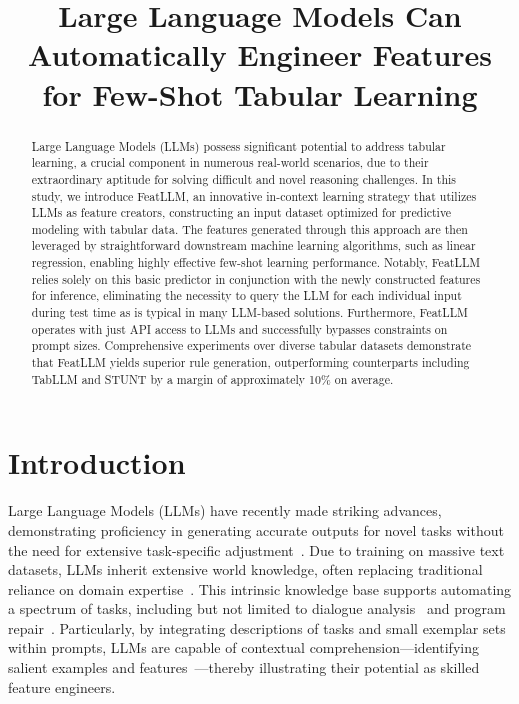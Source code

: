 \title{Large Language Models Can Automatically Engineer Features for Few-Shot Tabular Learning}

\begin{abstract}
Large Language Models (LLMs) possess significant potential to address tabular learning, a crucial component in numerous real-world scenarios, due to their extraordinary aptitude for solving difficult and novel reasoning challenges. In this study, we introduce \textsf{FeatLLM}, an innovative in-context learning strategy that utilizes LLMs as feature creators, constructing an input dataset optimized for predictive modeling with tabular data. The features generated through this approach are then leveraged by straightforward downstream machine learning algorithms, such as linear regression, enabling highly effective few-shot learning performance. Notably, \textsf{FeatLLM} relies solely on this basic predictor in conjunction with the newly constructed features for inference, eliminating the necessity to query the LLM for each individual input during test time as is typical in many LLM-based solutions. Furthermore, \textsf{FeatLLM} operates with just API access to LLMs and successfully bypasses constraints on prompt sizes. Comprehensive experiments over diverse tabular datasets demonstrate that \textsf{FeatLLM} yields superior rule generation, outperforming counterparts including TabLLM and STUNT by a margin of approximately 10\% on average.
\end{abstract}

\section{Introduction}
Large Language Models (LLMs) have recently made striking advances, demonstrating proficiency in generating accurate outputs for novel tasks without the need for extensive task-specific adjustment~\cite{creswell2022selection,imani2023mathprompter,taylor2022galactica}. Due to training on massive text datasets, LLMs inherit extensive world knowledge, often replacing traditional reliance on domain expertise~\cite{Genomes2021,singhal2023large,wilcox2003role}. This intrinsic knowledge base supports automating a spectrum of tasks, including but not limited to dialogue analysis~\cite{finch2023leveraging} and program repair~\cite{fan2023automated}. Particularly, by integrating descriptions of tasks and small exemplar sets within prompts, LLMs are capable of contextual comprehension—identifying salient examples and features~\cite{brown2020language,zhao2023survey}—thereby illustrating their potential as skilled feature engineers.

